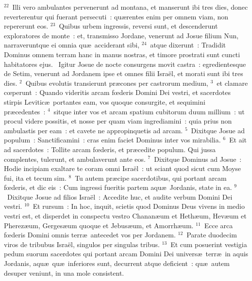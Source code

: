 ${}^{22}$~Illi vero ambulantes pervenerunt ad montana, et manserunt ibi tres dies, donec reverterentur qui fuerant persecuti~: qu\ae rentes enim per omnem viam, non repererunt eos.
${}^{23}$~Quibus urbem ingressis, reversi sunt, et descenderunt exploratores de monte~: et, transmisso Jordane, venerunt ad Josue filium Nun, narraveruntque ei omnia qu\ae\ acciderant sibi,
${}^{24}$~atque dixerunt~: Tradidit Dominus omnem terram hanc in manus nostras, et timore prostrati sunt cuncti habitatores ejus.
~\lettrine[lines=10,image=true,loversize=0.05,lraise=-0.03]{I}{}gitur Josue de nocte consurgens movit castra~: egredientesque de Setim, venerunt ad Jordanem ipse et omnes filii Isra\"el, et morati sunt ibi tres dies.
${}^{2}$~Quibus evolutis transierunt pr\ae cones per castrorum medium,
${}^{3}$~et clamare cœperunt~: Quando videritis arcam fœderis Domini Dei vestri, et sacerdotes stirpis Levitic\ae\ portantes eam, vos quoque consurgite, et sequimini pr\ae cedentes~:
${}^{4}$~sitque inter vos et arcam spatium cubitorum duum millium~: ut procul videre possitis, et nosse per quam viam ingrediamini~: quia prius non ambulastis per eam~: et cavete ne appropinquetis ad arcam.
${}^{5}$~Dixitque Josue ad populum~: Sanctificamini~: cras enim faciet Dominus inter vos mirabilia.
${}^{6}$~Et ait ad sacerdotes~: Tollite arcam fœderis, et pr\ae cedite populum. Qui jussa complentes, tulerunt, et ambulaverunt ante eos.
${}^{7}$~Dixitque Dominus ad Josue~: Hodie incipiam exaltare te coram omni Isra\"el~: ut sciant quod sicut cum Moyse fui, ita et tecum sim.
${}^{8}$~Tu autem pr\ae cipe sacerdotibus, qui portant arcam fœderis, et dic eis~: Cum ingressi fueritis partem aqu\ae\ Jordanis, state in ea.
${}^{9}$~Dixitque Josue ad filios Isra\"el~: Accedite huc, et audite verbum Domini Dei vestri.
${}^{10}$~Et rursum~: In hoc, inquit, scietis quod Dominus Deus vivens in medio vestri est, et disperdet in conspectu vestro Chanan\ae um et Heth\ae um, Hev\ae um et Pherez\ae um, Gerges\ae um quoque et Jebus\ae um, et Amorrh\ae um.
${}^{11}$~Ecce arca fœderis Domini omnis terr\ae\ antecedet vos per Jordanem.
${}^{12}$~Parate duodecim viros de tribubus Isra\"el, singulos per singulas tribus.
${}^{13}$~Et cum posuerint vestigia pedum suorum sacerdotes qui portant arcam Domini Dei univers\ae\ terr\ae\ in aquis Jordanis, aqu\ae\ qu\ae\ inferiores sunt, decurrent atque deficient~: qu\ae\ autem desuper veniunt, in una mole consistent.


